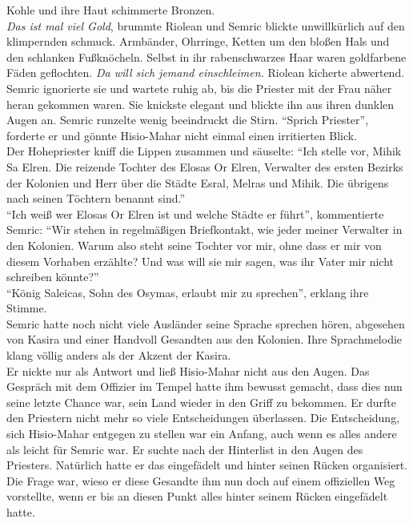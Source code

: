 Kohle und ihre Haut schimmerte Bronzen.\\
\textit{Das ist mal viel Gold}, brummte Riolean und Semric blickte unwillkürlich auf den 
klimpernden schmuck. Armbänder, Ohrringe, Ketten um den bloßen Hals und den schlanken Fußknöcheln. 
Selbst in ihr rabenschwarzes Haar waren goldfarbene Fäden geflochten. \textit{Da will sich jemand 
einschleimen.} Riolean kicherte abwertend.\\
Semric ignorierte sie und wartete ruhig ab, bis die Priester mit der Frau näher heran gekommen 
waren. Sie knickste elegant und blickte ihn aus ihren dunklen Augen an. Semric runzelte wenig 
beeindruckt die Stirn. ``Sprich Priester'', forderte er und gönnte Hisio-Mahar nicht einmal einen 
irritierten Blick.\\
Der Hohepriester kniff die Lippen zusammen und säuselte: ``Ich stelle vor, Mihik Sa Elren. Die 
reizende Tochter des Elosas Or Elren, Verwalter des ersten Bezirks der Kolonien und Herr über die 
Städte Esral, Melras und Mihik. Die übrigens nach seinen Töchtern benannt sind.''\\
``Ich weiß wer Elosas Or Elren ist und welche Städte er führt'', kommentierte Semric: ``Wir stehen 
in regelmäßigen Briefkontakt, wie jeder meiner Verwalter in den Kolonien. Warum also steht seine 
Tochter vor mir, ohne dass er mir von diesem Vorhaben erzählte? Und was will sie mir sagen, was ihr 
Vater mir nicht schreiben könnte?''\\
``König Saleicas, Sohn des Osymas, erlaubt mir zu sprechen'', erklang ihre Stimme.\\
Semric hatte noch nicht viele Ausländer seine Sprache sprechen hören, abgesehen von Kasira und 
einer Handvoll Gesandten aus den Kolonien. Ihre Sprachmelodie klang völlig anders als der Akzent 
der Kasira.\\
Er nickte nur als Antwort und ließ Hisio-Mahar nicht aus den Augen. Das Gespräch mit dem Offizier 
im Tempel hatte ihm bewusst gemacht, dass dies nun seine letzte Chance war, sein Land wieder in den 
Griff zu bekommen. Er durfte den Priestern nicht mehr so viele Entscheidungen überlassen. Die 
Entscheidung, sich Hisio-Mahar entgegen zu stellen war ein Anfang, auch wenn es alles andere als 
leicht für Semric war. Er suchte nach der Hinterlist in den Augen des Priesters. Natürlich hatte er 
das eingefädelt und hinter seinen Rücken organisiert. Die Frage war, wieso er diese Gesandte ihm 
nun doch auf einem offiziellen Weg vorstellte, wenn er bis an diesen Punkt alles hinter seinem 
Rücken eingefädelt hatte.\\
